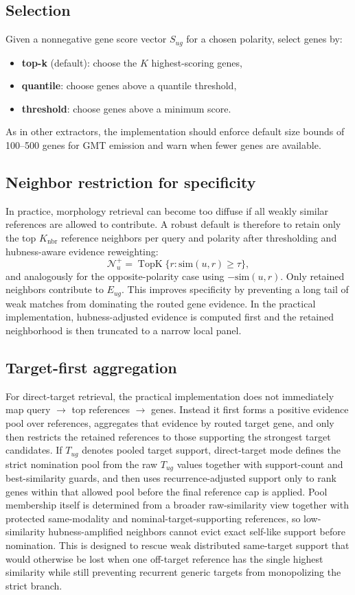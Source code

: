 \documentclass[11pt]{article}
\begin{document}
\subsection{Selection}
Given a nonnegative gene score vector $S_{ug}$ for a chosen polarity, select genes by:
\begin{itemize}[leftmargin=2em]
\item \textbf{top-k} (default): choose the $K$ highest-scoring genes,
\item \textbf{quantile}: choose genes above a quantile threshold,
\item \textbf{threshold}: choose genes above a minimum score.
\end{itemize}
As in other extractors, the implementation should enforce default size bounds of 100--500 genes for GMT emission and warn when fewer genes are available.

\subsection{Neighbor restriction for specificity}
In practice, morphology retrieval can become too diffuse if all weakly similar references are allowed to contribute. A robust default is therefore to retain only the top $K_{\mathrm{nbr}}$ reference neighbors per query and polarity after thresholding and hubness-aware evidence reweighting:
\[
\mathcal{N}_u^+ = \operatorname{TopK}\{r : \mathrm{sim}(u,r) \ge \tau\},
\]
and analogously for the opposite-polarity case using $-\mathrm{sim}(u,r)$.
Only retained neighbors contribute to $E_{ug}$. This improves specificity by preventing a long tail of weak matches from dominating the routed gene evidence. In the practical implementation, hubness-adjusted evidence is computed first and the retained neighborhood is then truncated to a narrow local panel.

\subsection{Target-first aggregation}
For direct-target retrieval, the practical implementation does not immediately map query $\rightarrow$ top references $\rightarrow$ genes. Instead it first forms a positive evidence pool over references, aggregates that evidence by routed target gene, and only then restricts the retained references to those supporting the strongest target candidates. If $T_{ug}$ denotes pooled target support, direct-target mode defines the strict nomination pool from the raw $T_{ug}$ values together with support-count and best-similarity guards, and then uses recurrence-adjusted support only to rank genes within that allowed pool before the final reference cap is applied. Pool membership itself is determined from a broader raw-similarity view together with protected same-modality and nominal-target-supporting references, so low-similarity hubness-amplified neighbors cannot evict exact self-like support before nomination. This is designed to rescue weak distributed same-target support that would otherwise be lost when one off-target reference has the single highest similarity while still preventing recurrent generic targets from monopolizing the strict branch.
\end{document}
